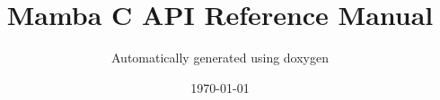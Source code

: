 \documentclass[a4paper,10pt,oneside]{article}
\title{Mamba C API Reference Manual}
\author{Automatically generated using doxygen}
\date\today
\newcommand{\+}{\discretionary{\mbox{\scriptsize$\hookleftarrow$}}{}{}}
\begin{document}
\mambaCover
\mambaContent
\end{document}
